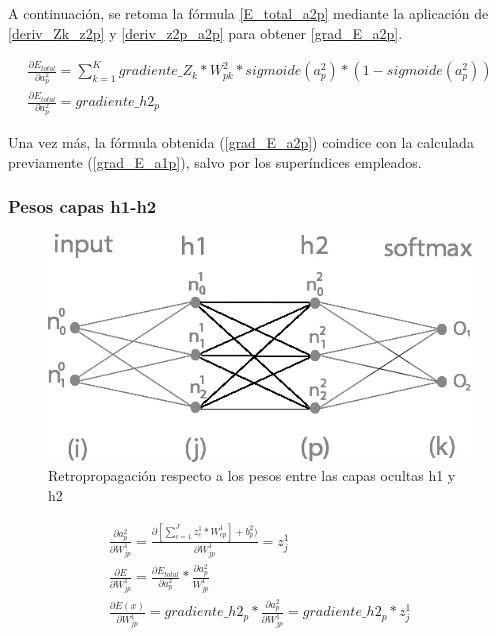 A continuación, se retoma la fórmula \ref{E_total_a2p} mediante la aplicación de \ref{deriv_Zk_z2p} y \ref{deriv_z2p_a2p} para obtener \ref{grad_E_a2p}.

\begin{gather}
	\frac{\partial E_{total}}{\partial a^2_p} = \sum_{k=1}^K  gradiente\_Z_k * W^2_{pk} * sigmoide(a^2_p)*(1-sigmoide(a^2_p)) \label{grad_E_a2p} \\
	\frac{\partial E_{total}}{\partial a^2_p} = gradiente\_h2_p
\end{gather}

Una vez más, la fórmula obtenida (\ref{grad_E_a2p}) coindice con la calculada previamente (\ref{grad_E_a1p}), salvo por los superíndices empleados. \\

\subsubsection{Pesos capas h1-h2}

\begin{figure}[H]
	\centering
	\includegraphics[scale=0.35]{imagenes/nn_2_capa_pesos_h1_h2.jpg}  
	\caption{Retropropagación respecto a los pesos entre las capas ocultas h1 y h2}
	\label{fig:nn_2_pesos_h1_h2}
\end{figure}


\begin{gather}
	\frac{\partial a^2_p }{\partial W^1_{jp} } = \frac{\partial [\sum_{c=1}^{J} z^1_c * W^1_{cp}] + b^2_p)}{\partial W^1_{jp} } = z^1_j \\
	\frac{\partial E}{\partial W^1_{jp}} = \frac{\partial E_{total} }{\partial a^2_p } * \frac{\partial a^2_p}{W^1_{jp}} \\
	\frac{\partial E(x) }{\partial W^1_{jp} } = gradiente\_h2_p * \frac{\partial a^2_p }{\partial W^1_{jp} } = gradiente\_h2_p * z^1_j 
	\label{grad_w1jp}
\end{gather}

